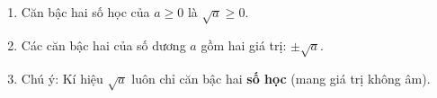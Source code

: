 \begin{enumerate}
\item Căn bậc hai số học của $a \ge 0$ là $\sqrt{a} \ge 0$.
\item Các căn bậc hai của số dương $a$ gồm hai giá trị: $\pm \sqrt{a}$.
\item Chú ý: Kí hiệu $\sqrt{a}$ luôn chỉ căn bậc hai \textbf{số học} (mang giá trị không âm).
\end{enumerate}
